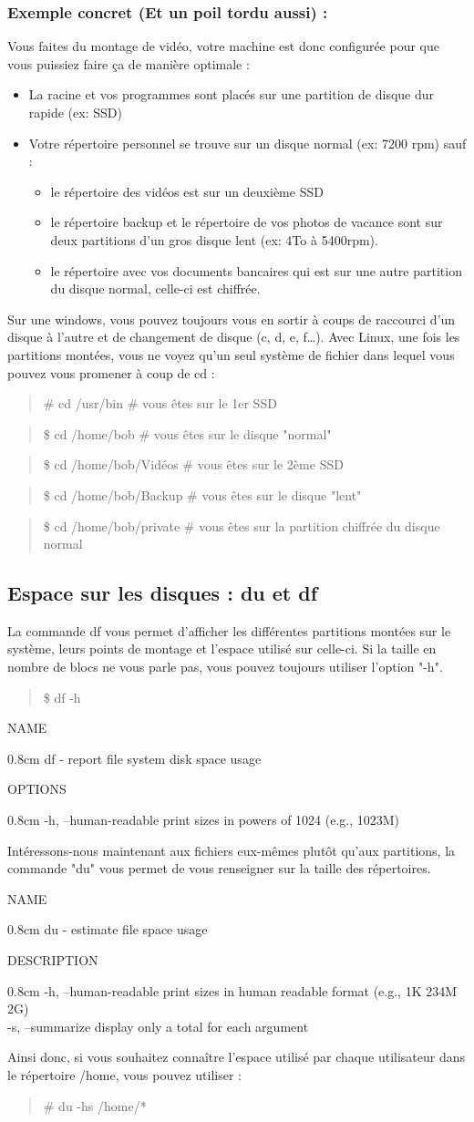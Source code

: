 \documentclass[a4paper,11pt]{article}
\newcommand{\commande}[1] {
    \begin{quote}
    \tt\raggedright #1
    \end{quote}
}
\newcommand{\man}[2]{
    \begin{tcolorbox}[toprule=3mm,width=\textwidth,outer arc=0mm,colbacktitle=grayman,coltitle=black,colback={grayman},colframe={grayman},title={man : \tt #1}]
        \tt\raggedright #2
    \end{tcolorbox}
}
\newcommand{\mandesc}[1]{
    \begin{adjustwidth}{0.8cm}{}
        #1
    \end{adjustwidth}
}
\begin{document}
\subsubsection*{Exemple concret (Et un poil tordu aussi) :}
\par Vous faites du montage de vidéo, votre machine est donc configurée pour que vous puissiez faire ça de manière optimale :
\begin{itemize}
\item La racine et vos programmes sont placés sur une partition de disque dur rapide (ex: SSD)
\item Votre répertoire personnel se trouve sur un disque normal (ex: 7200 rpm) sauf :
    \begin{itemize}
    \item le répertoire des vidéos est sur un deuxième SSD
    \item le répertoire backup et le répertoire de vos photos de vacance sont sur deux partitions d'un gros disque lent (ex: 4To à 5400rpm).
    \item le répertoire avec vos documents bancaires qui est sur une autre partition du disque normal, celle-ci est chiffrée.
    \end{itemize}
\end{itemize}
\par Sur une windows, vous pouvez toujours vous en sortir à coups de raccourci d'un disque à l'autre et de changement de disque (c, d, e, f\dots). Avec Linux, une fois les partitions montées, vous ne voyez qu'un seul système de fichier dans lequel vous pouvez vous promener à coup de cd :
\commande{\# cd /usr/bin \# vous êtes sur le 1er SSD}
\commande{\$ cd /home/bob \# vous êtes sur le disque "normal"}
\commande{\$ cd /home/bob/Vidéos \# vous êtes sur le 2ème SSD}
\commande{\$ cd /home/bob/Backup \# vous êtes sur le disque "lent"}
\commande{\$ cd /home/bob/private \# vous êtes sur la partition chiffrée du disque normal}

\subsection{Espace sur les disques : du et df}
\par La commande df vous permet d'afficher les différentes partitions montées sur le système, leurs points de montage et l'espace utilisé sur celle-ci. Si la taille en nombre de blocs ne vous parle pas, vous pouvez toujours utiliser l'option "-h".
\commande{\$ df -h}
\man{df}{
NAME
\mandesc{df - report file system disk space usage}
OPTIONS
\mandesc{-h, --human-readable print sizes in powers of 1024 (e.g., 1023M)}
}
\par Intéressons-nous maintenant aux fichiers eux-mêmes plutôt qu'aux partitions, la commande "du" vous permet de vous renseigner sur la taille des répertoires.
\man{du}{
NAME
\mandesc{du - estimate file space usage}
DESCRIPTION
\mandesc{-h, --human-readable print sizes in human readable format (e.g., 1K 234M 2G)\\
-s, --summarize display only a total for each argument}
}
Ainsi donc, si vous souhaitez connaître l'espace utilisé par chaque utilisateur dans le répertoire /home, vous pouvez utiliser :
\commande{\# du -hs /home/*}
\end{document}
